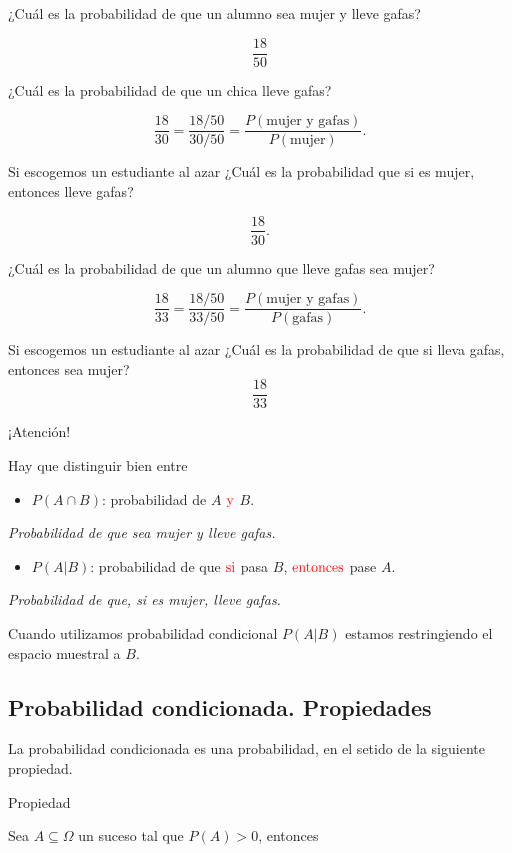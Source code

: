 \documentclass[
  letterpaper,
  DIV=11,
  numbers=noendperiod]{scrreprt}
\providecommand{\tightlist}{%
  \setlength{\itemsep}{0pt}\setlength{\parskip}{0pt}}\usepackage{longtable,booktabs,array}
\begin{document}
¿Cuál es la probabilidad de que un alumno sea mujer y lleve gafas?

\[
\frac{18}{50}
\]

¿Cuál es la probabilidad de que un chica lleve gafas?

\[
\frac{18}{30}=\frac{18/50}{30/50}=\frac{P(\mbox{mujer  y gafas})}{P(\mbox{mujer})}.
\]

Si escogemos un estudiante al azar ¿Cuál es la probabilidad que si es
mujer, entonces lleve gafas?

\[
\frac{18}{30}.
\]

¿Cuál es la probabilidad de que un alumno que lleve gafas sea mujer?

\[
\frac{18}{33}=\frac{18/50}{33/50}=\frac{P(\mbox{mujer y gafas})}{P(\mbox{gafas})}.
\]

Si escogemos un estudiante al azar ¿Cuál es la probabilidad de que si
lleva gafas, entonces sea mujer? \[
    \frac{18}{33}
    \]

¡Atención!

Hay que distinguir bien entre

\begin{itemize}
\tightlist
\item
  \(P(A\cap B)\): probabilidad de \(A\) \(\color{red}{\text{y}}\) \(B\).
\end{itemize}

\emph{Probabilidad de que sea mujer y lleve gafas.}

\begin{itemize}
\tightlist
\item
  \(P(A|B)\): probabilidad de que \(\color{red}{\text{si}}\) pasa \(B\),
  \(\color{red}{\text{entonces}}\) pase \(A\).
\end{itemize}

\emph{Probabilidad de que, si es mujer, lleve gafas.}

Cuando utilizamos probabilidad condicional \(P(A|B)\) estamos
restringiendo el espacio muestral a \(B\).

\subsection{Probabilidad condicionada.
Propiedades}\label{probabilidad-condicionada.-propiedades}

La probabilidad condicionada es una probabilidad, en el setido de la
siguiente propiedad.

Propiedad

Sea \(A\subseteq \Omega\) un suceso tal que \(P(A)>0\), entonces
\end{document}
